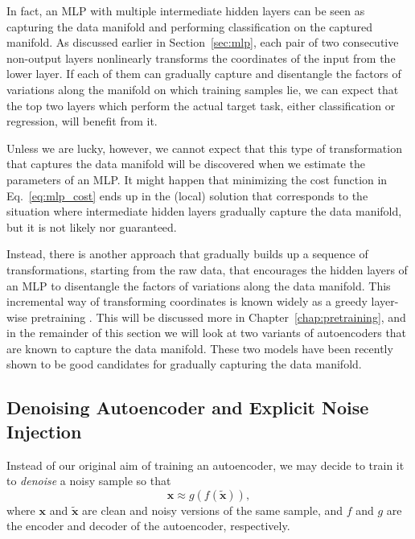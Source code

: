 \documentclass[dissertation,nocontribution]{aaltoseries}
\newcommand{\vect}[1]{\mathbf{#1}}
\newcommand{\vx}[0]{\vect{x}}
\begin{document}
In fact, an MLP with multiple intermediate hidden layers can
be seen as capturing the data manifold and performing
classification on the captured manifold. As discussed
earlier in Section~\ref{sec:mlp}, each pair of two
consecutive non-output layers nonlinearly transforms the
coordinates of the input from the lower layer. If each of
them can gradually capture and disentangle the factors of
variations along the manifold on which training samples lie,
we can expect that the top two layers which perform the
actual target task, either classification or regression,
will benefit from it.

Unless we are lucky, however, we cannot expect that this type of
transformation that captures the data manifold will be discovered when we
estimate the parameters of an MLP. It might happen that minimizing the cost
function in Eq.~\eqref{eq:mlp_cost} ends up in the (local) solution that
corresponds to the situation where intermediate hidden layers gradually
capture the data manifold, but it is not likely nor guaranteed.

Instead, there is another approach that gradually builds up a
sequence of transformations, starting from the raw data, that 
encourages the hidden layers of an MLP to disentangle the factors
of variations along the data manifold.  This incremental way of
transforming coordinates is known widely as a greedy layer-wise
pretraining \citep{Hinton2006}. This will be discussed more in
Chapter~\ref{chap:pretraining}, and in the remainder of this
section we will look at two variants of autoencoders that are
known to capture the data manifold. These two models have been
recently shown to be good candidates for gradually capturing the
data manifold.


\subsection{Denoising Autoencoder and Explicit Noise
Injection}
\label{sec:dae}


Instead of our original aim of training an autoencoder, we
may decide to train it to \textit{denoise} a noisy sample so
that 
\[
\vx \approx g(f(\tilde{\vx})),
\]
where $\vx$ and $\tilde{\vx}$ are clean and noisy versions
of the same sample, and $f$ and $g$ are the encoder and
decoder of the autoencoder, respectively. 
\end{document}
